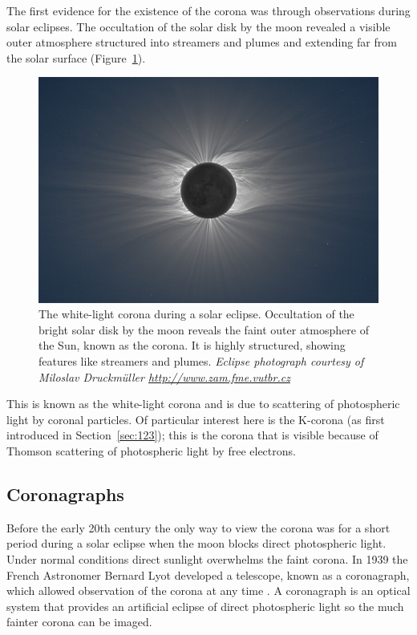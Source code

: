 The first evidence for the existence of the corona was through observations during solar eclipses. The occultation of the solar disk by the moon revealed a visible outer atmosphere structured into streamers and plumes and extending far from the solar surface (Figure~\ref{fig:seclipse}). 
\begin{figure}[!t]
\begin{center}
\includegraphics[scale=0.45]{images/solar_eclipse}
\caption[White-light corona during an eclipse]{The white-light corona during a solar eclipse. Occultation of the bright solar disk by the moon reveals the faint outer atmosphere of the Sun, known as the corona. It is highly structured, showing features like streamers and plumes. {\it Eclipse photograph courtesy of Miloslav Druckm\"{u}ller \href{http://www.zam.fme.vutbr.cz/~druck/Index.htm}{http://www.zam.fme.vutbr.cz}}}
\label{fig:seclipse}
\end{center}
\end{figure}
This is known as the white-light corona and is due to scattering of photospheric light by coronal particles. Of particular interest here is the K-corona (as first introduced in Section~\ref{sec:123}); this is the corona that is visible because of Thomson scattering of photospheric light by free electrons. 
\subsection{Coronagraphs}
\doublespacing
Before the early 20th century the only way to view the corona was for a short period during a solar eclipse when the moon blocks direct photospheric light. Under normal conditions direct sunlight overwhelms the faint corona. In 1939 the French Astronomer Bernard Lyot developed a telescope, known as a coronagraph, which allowed observation of the corona at any time \citep{lyot1939}. A coronagraph is an optical system that provides an artificial eclipse of direct photospheric light so the much fainter corona can be imaged.

